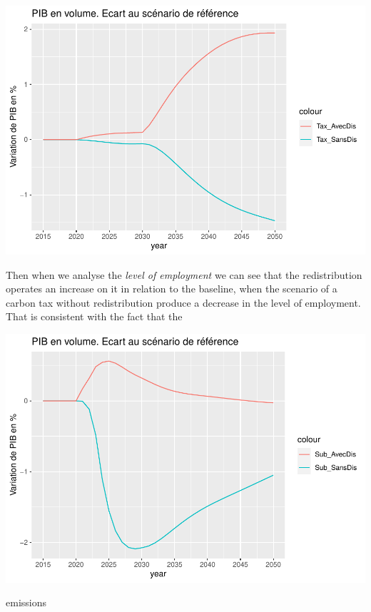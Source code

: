 \documentclass[
]{article}
\begin{document}
\includegraphics{Modele-ThreeMe-Tunisie_Sequeira_Valilou_Wang_files/figure-latex/unnamed-chunk-8-1.pdf}

Then when we analyse the \emph{level of employment} we can see that the
redistribution operates an increase on it in relation to the baseline,
when the scenario of a carbon tax without redistribution produce a
decrease in the level of employment. That is consistent with the fact
that the

\includegraphics{Modele-ThreeMe-Tunisie_Sequeira_Valilou_Wang_files/figure-latex/unnamed-chunk-9-1.pdf}

emissions
\end{document}
